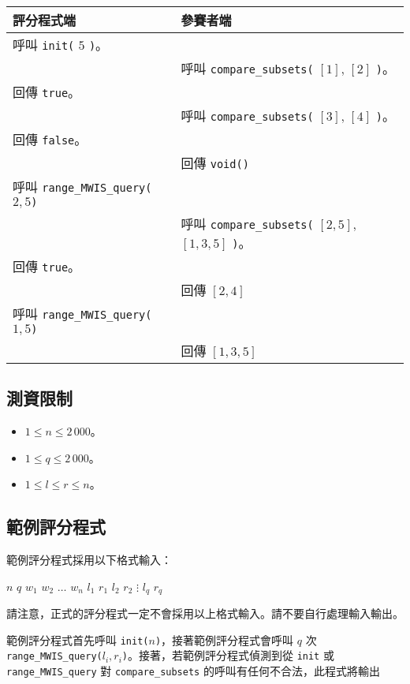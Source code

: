 \begin{longtable}[]{@{}ll@{}}
\toprule
評分程式端 & 參賽者端 \\
\midrule
\endhead
呼叫 \texttt{init(} \(5\) \texttt{)}。 & \\
& 呼叫 \texttt{compare\_subsets(} \([1]\), \([2]\) \texttt{)}。 \\
回傳 \texttt{true}。 & \\
& 呼叫 \texttt{compare\_subsets(} \([3]\), \([4]\) \texttt{)}。 \\
回傳 \texttt{false}。 & \\
& 回傳 \texttt{void()} \\
呼叫 \texttt{range\_MWIS\_query(}\(2, 5\)\texttt{)} & \\
& 呼叫 \texttt{compare\_subsets(} \([2, 5]\), \([1, 3, 5]\)
\texttt{)}。 \\
回傳 \texttt{true}。 & \\
& 回傳 \([2, 4]\) \\
呼叫 \texttt{range\_MWIS\_query(}\(1, 5\)\texttt{)} & \\
& 回傳 \([1, 3, 5]\) \\
\bottomrule
\end{longtable}

\subsection{測資限制}

\begin{itemize}
\tightlist
\item
  \(1\le n \le 2\,000\)。
\item
  \(1\le q \le 2\,000\)。
\item
  \(1\le l \le r \le n\)。
\end{itemize}

\subsection{範例評分程式}

範例評分程式採用以下格式輸入：

\begin{format}
\f{
$n$ $q$
$w_1$ $w_2$ $\ldots$ $w_n$
$l_1$ $r_1$
$l_2$ $r_2$
$\vdots$
$l_q$ $r_q$
}
\end{format}

請注意，正式的評分程式一定不會採用以上格式輸入。請不要自行處理輸入輸出。

範例評分程式⾸先呼叫
\texttt{init(}\(n\)\texttt{)}，接著範例評分程式會呼叫 \(q\) 次
\texttt{range\_MWIS\_query(}\(l_i, r_i\)\texttt{)}。接著，若範例評分程式偵測到從
\texttt{init} 或 \texttt{range\_MWIS\_query} 對
\texttt{compare\_subsets} 的呼叫有任何不合法，此程式將輸出

